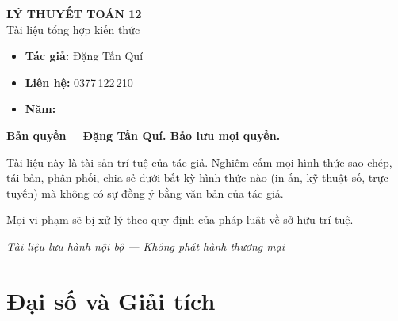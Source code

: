 \documentclass[12pt,a4paper]{article}
\begin{document}
\newpage

\thispagestyle{empty}
\vspace*{5cm}
\begin{center}
  {\Large\bfseries LÝ THUYẾT TOÁN 12}\\[8pt]
  {\large Tài liệu tổng hợp kiến thức}
\end{center}

\vspace{2cm}

\begin{tcolorbox}[
  enhanced, colback=red!3!white, colframe=red!60!black,
  fonttitle=\bfseries, title={Thông tin bản quyền},
  boxrule=1.5pt
]
  \begin{itemize}[leftmargin=*]
    \item \textbf{Tác giả:} Đặng Tấn Quí
    \item \textbf{Liên hệ:} 0377\,122\,210
    \item \textbf{Năm:} \the\year
  \end{itemize}

  \vspace{8pt}
  \textbf{Bản quyền \textcopyright\ \the\year\ Đặng Tấn Quí. Bảo lưu mọi quyền.}

  \vspace{6pt}
  Tài liệu này là tài sản trí tuệ của tác giả. Nghiêm cấm mọi hình thức sao chép, tái bản, phân phối, chia sẻ dưới bất kỳ hình thức nào (in ấn, kỹ thuật số, trực tuyến) mà không có sự đồng ý bằng văn bản của tác giả.

  \vspace{6pt}
  Mọi vi phạm sẽ bị xử lý theo quy định của pháp luật về sở hữu trí tuệ.
\end{tcolorbox}

\vfill
\begin{center}
  \small\textit{Tài liệu lưu hành nội bộ --- Không phát hành thương mại}
\end{center}

\newpage

\tableofcontents
\newpage

\section{Đại số và Giải tích}
\end{document}
